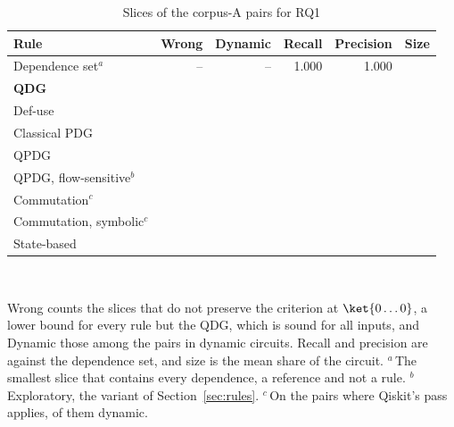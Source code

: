 \begin{table}[t]
  \centering
  \caption{Slices of the \numNPairs{} corpus-A pairs for RQ1}
  \label{tab:rq1}
  \footnotesize\setlength{\tabcolsep}{3pt}\renewcommand{\arraystretch}{1.12}
  \newcommand{\sep}{\arrayrulecolor{black!25}\hline\arrayrulecolor{black}}
  \begin{tabular}{@{}l r r r r r@{}}
    \toprule
    \textbf{Rule} & \textbf{Wrong} & \textbf{Dynamic} & \textbf{Recall} & \textbf{Precision} & \textbf{Size} \\
    \midrule
    Dependence set$^{a}$ & -- & -- & 1.000 & 1.000 & \numDepFloor{} \\
    \midrule
    \rowcolor{blue!7}\textbf{QDG} & \textbf{\numRqOneLcUnsound{}} & \numLcDynamicUnsound{} & \textbf{\numRqOneLcRecall{}} & \numRqOneLcPrecision{} & \numRqOneLcSize{} \\ \sep
    Def-use & \numRqOneDuUnsound{} & \numDuDynamicUnsound{} & \numRqOneDuRecall{} & \numRqOneDuPrecision{} & \numRqOneDuSize{} \\ \sep
    Classical PDG & \numCpdgUnsound{} & \numCpdgDynamicUnsound{} & \numCpdgRecall{} & \numCpdgPrecision{} & \numCpdgSize{} \\ \sep
    QPDG~\cite{yu2025qpdg} & \numRqOneYzUnsound{} & \numYzDynamicUnsound{} & \numRqOneYzRecall{} & \numRqOneYzPrecision{} & \numRqOneYzSize{} \\ \sep
    QPDG, flow-sensitive$^{b}$ & \numYzfUnsound{} & \numYzfDynamicUnsound{} & \numYzfRecall{} & \numYzfPrecision{} & \numYzfSize{} \\
    \midrule
    Commutation$^{c}$ & \numLcqUnsound{} & \numLcqDynamicUnsound{} & \numLcqRecall{} & \numLcqPrecision{} & \numLcqSize{} \\ \sep
    Commutation, symbolic$^{c}$ & \numLcqsUnsound{} & \numLcqsDynamicUnsound{} & \numLcqsRecall{} & \numLcqsPrecision{} & \numLcqsSize{} \\ \sep
    State-based & \numRqOneQUnsound{} & \numQDynamicUnsound{} & \numRqOneQRecall{} & \numRqOneQPrecision{} & \numRqOneQSize{} \\
    \bottomrule
  \end{tabular}\\[3pt]
  \begin{minipage}{\columnwidth}\footnotesize
  Wrong counts the slices that do not preserve the criterion at $\ket{0\dots0}$, a lower bound for every rule but the
  QDG, which is sound for all inputs, and Dynamic those among the \numNDynamicPairs{} pairs in dynamic circuits.
  Recall and precision are against the dependence set, and size is the mean share of the circuit. $^{a}$\,The
  smallest slice that contains every dependence, a reference and not a rule. $^{b}$\,Exploratory, the variant of
  Section~\ref{sec:rules}. $^{c}$\,On the \numLcqApplicable{} pairs where Qiskit's pass
  applies, \numLcqDynamicN{} of them dynamic.
  \end{minipage}
\end{table}

